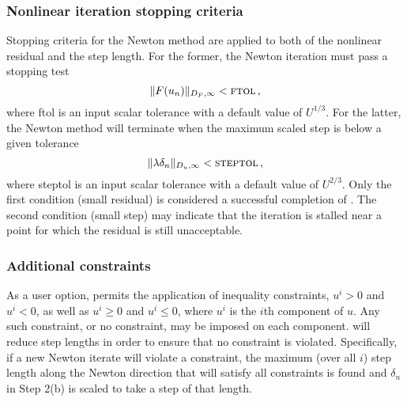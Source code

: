 \subsubsection*{Nonlinear iteration stopping criteria}
Stopping criteria for the Newton method are applied to
both of the nonlinear residual and the step length.  For the
former, the Newton iteration must pass a stopping test
\[ \|F(u_n)\|_{D_F,\infty} < \mbox{\sc ftol} \, , \]
where {\sc ftol} is an input scalar tolerance with a default value
of $U^{1/3}$. For the latter, the Newton method will terminate
when the maximum scaled step is below a given tolerance
\[ \|\lambda\delta_n\|_{D_u,\infty} < \mbox{\sc steptol} \, , \]
where {\sc steptol} is an input scalar tolerance with a default
value of $U^{2/3}$.  Only the first condition (small residual)
is considered a successful completion of {\kinsol}.  The second
condition (small step) may indicate that the iteration is stalled
near a point for which the residual is still unacceptable.


\subsubsection*{Additional constraints}
As a user option, {\kinsol} permits the application of inequality
constraints, $u^i > 0$ and $u^i < 0$, as well as $u^i \geq 0$ and
$u^i \leq 0$, where $u^i$ is the $i$th component of $u$.  Any such
constraint, or no constraint, may be imposed on each component.
{\kinsol} will reduce step lengths in order to ensure that no
constraint is violated.  Specifically, if a new Newton iterate
will violate a constraint, the maximum (over all $i$) step length
along the Newton direction that will satisfy all constraints is
found and $\delta_n$ in Step 2(b) is scaled to take a step of that
length.


